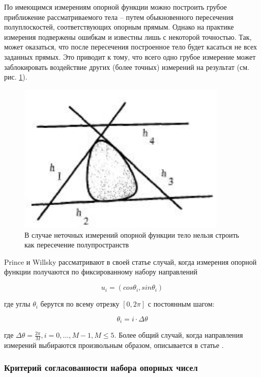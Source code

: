 \documentclass[a4paper, 12pt, titlepage]{article}
\theoremstyle{definition}
\theoremstyle{plain}
\begin{document}
По имеющимся измерениям опорной функции можно построить грубое приближение
рассматриваемого тела -- путем обыкновенного пересечения полуплоскостей,
соответствующих опорным прямым. Однако на практике измерения подвержены
ошибкам и известны лишь с некоторой точностью. Так, может оказаться, что
после пересечения построенное тело будет касаться не всех заданных прямых.
Это приводит к тому, что всего одно грубое измерение может заблокировать
воздействие других (более точных) измерений на результат (см. рис.
\ref{inconsistent}).

\begin{figure}[ht]
    \includegraphics[width=10cm]{images/inconsistent-support-planes.jpg}
    \caption{В случае неточных измерений опорной функции тело нельзя строить
    как пересечение полупространств}
    \label{inconsistent}
\end{figure}

Prince и Willsky рассматривают в своей статье случай, когда измерения опорной
функции получаются по фиксированному набору направлений

\begin{equation}
 u_{i} = (cos \theta_{i}, sin \theta_{i})
\end{equation}

где углы $\theta_{i}$ берутся по всему отрезку $[0, 2 \pi]$ с постоянным шагом:

\begin{equation}
 \theta_{i} = i \cdot \Delta \theta
\end{equation}

где $\Delta \theta = \frac{2 \pi}{M}, i = 0, \ldots, M - 1, M \leq 5$. Более
общий случай, когда направления измерений выбираются произвольным образом,
описывается в статье
\cite[Lele - Kulkarni - Willsky (1992)]{journals/josaa/LeleKW92}.

\subsubsection{Критерий согласованности набора опорных чисел}
\label{sec:history/PrinceW90/criterion}
\end{document}

